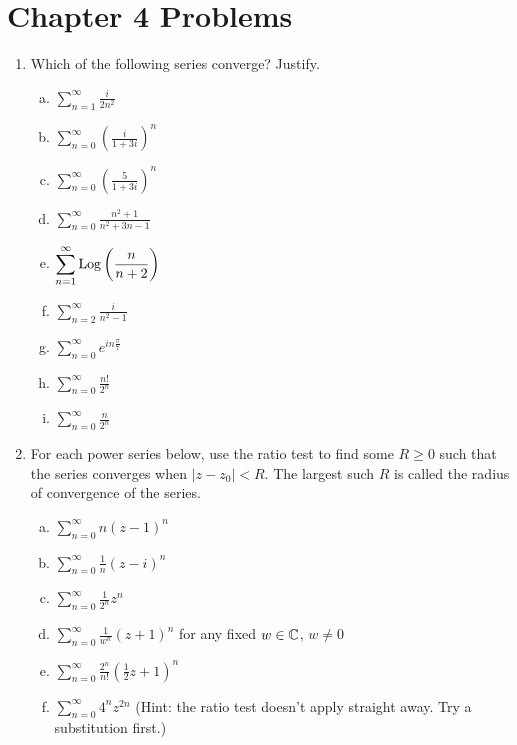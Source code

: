 \section*{Chapter 4 Problems}

\begin{enumerate}

\item Which of the following series converge? Justify.

\begin{enumerate}[a)]
\item $\displaystyle \sum_{n = 1}^{\infty} \frac{i}{2n^2}$
\item $\displaystyle \sum_{n = 0}^{\infty} \left(\frac{i}{1 + 3i}\right)^n$
\item $\displaystyle \sum_{n = 0}^{\infty} \left(\frac{5}{1 + 3i}\right)^n$
\item $\displaystyle \sum_{n = 0}^{\infty} \frac{n^2 + 1}{n^2 + 3n - 1}$
\item $\displaystyle \sum_{n = 1}^{\infty} \mathrm{Log}\left(\frac{n}{n + 2}\right)$
\item $\displaystyle \sum_{n = 2}^{\infty} \frac{i}{n^2 - 1}$
\item $\displaystyle \sum_{n = 0}^{\infty} e^{i n \frac{\pi}{7}}$
\item $\displaystyle \sum_{n = 0}^{\infty} \frac{n!}{2^n}$
\item $\displaystyle \sum_{n = 0}^{\infty} \frac{n}{2^n}$
\end{enumerate}

\newpage

\item For each power series below, use the ratio test to find some $R\ge 0$ such that the series converges when $|z-z_0| < R$. The largest such $R$ is called the radius of convergence of the series.

\begin{enumerate}[a)]
\item $\displaystyle \sum_{n = 0}^{\infty} n(z-1)^n$
\item $\displaystyle \sum_{n = 0}^{\infty} \frac{1}{n}(z-i)^n$
\item $\displaystyle \sum_{n = 0}^{\infty} \frac{1}{2^n}z^n$
\item $\displaystyle \sum_{n = 0}^{\infty} \frac{1}{w^n}(z+1)^n$ for any fixed $w \in \mathbb{C}$, $w\ne 0$
\item $\displaystyle \sum_{n = 0}^{\infty} \frac{2^n}{n!}\left(\frac{1}{2}z + 1\right)^n$
\item $\displaystyle \sum_{n = 0}^{\infty} 4^nz^{2n}$ (Hint: the ratio test doesn't apply straight away. Try a substitution first.)
\end{enumerate}



\end{enumerate}
